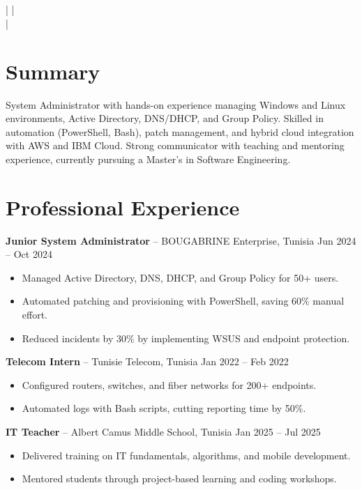 \documentclass[a4paper,10pt]{article}
\begin{document}
\begin{center}
    {\LARGE \textbf{\FullName}} \\
    \JobTitle \\
    \Phone \;|\; \href{mailto:\Email}{\Email} \;|\; \Location \\
    \LinkedIn \;|\; \GitHub
\end{center}

\section*{Summary}
System Administrator with hands-on experience managing Windows and Linux environments, Active Directory, DNS/DHCP, and Group Policy. Skilled in automation (PowerShell, Bash), patch management, and hybrid cloud integration with AWS and IBM Cloud. Strong communicator with teaching and mentoring experience, currently pursuing a Master’s in Software Engineering.

\section*{Professional Experience}
\textbf{Junior System Administrator} – BOUGABRINE Enterprise, Tunisia \hfill Jun 2024 -- Oct 2024
\begin{itemize}
    \item Managed Active Directory, DNS, DHCP, and Group Policy for 50+ users.
    \item Automated patching and provisioning with PowerShell, saving 60\% manual effort.
    \item Reduced incidents by 30\% by implementing WSUS and endpoint protection.
\end{itemize}

\textbf{Telecom Intern} – Tunisie Telecom, Tunisia \hfill Jan 2022 -- Feb 2022
\begin{itemize}
    \item Configured routers, switches, and fiber networks for 200+ endpoints.
    \item Automated logs with Bash scripts, cutting reporting time by 50\%.
\end{itemize}

\textbf{IT Teacher} – Albert Camus Middle School, Tunisia \hfill Jan 2025 -- Jul 2025
\begin{itemize}
    \item Delivered training on IT fundamentals, algorithms, and mobile development.
    \item Mentored students through project-based learning and coding workshops.
\end{itemize}
\end{document}
